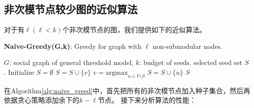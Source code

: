 \subsection{非次模节点较少图的近似算法}
对于有$\ell (\ell<k)$个非次模节点的图，我们提供如下的近似算法。
\begin{algorithm}[h]
	\caption{\textbf{Naive-Greedy(G,k)}: Greedy for graph with $\ell$ non-submodular nodes.}
	\label{alg:naive_greed} 
	\begin{algorithmic}[1]
		\Require $G$: social graph of general threshold model, $k$: budget of seeds.
		\Ensure selected seed set $S$.
		\State Initialize $S = \emptyset$
			\State $S = S \cup \{v\}$
		\EndFor
			\State $v = \mathrm{argmax}_{u \in V \setminus S}$ 
			\State $S = S \cup \{u\}$
		\EndFor
		\State \Return $S$
	\end{algorithmic} 
\end{algorithm}
在Algorithm\ref{alg:naive_greed}中，首先把所有的非次模节点加入种子集合，然后再依据贪心策略添加余下的$k - \ell$节点。
接下来分析算法的性能：


